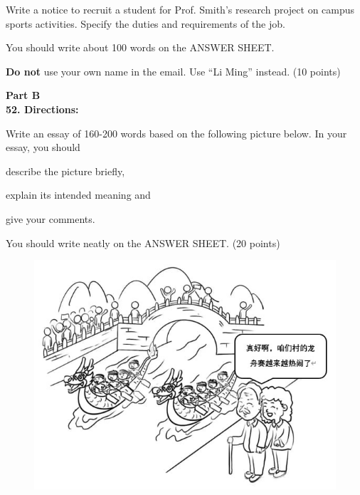 Write a notice to recruit a student for Prof. Smith's research project on campus sports activities. Specify the duties and requirements of the job.

You should write about 100 words on the ANSWER SHEET.

\textbf{Do not} use your own name in the email. Use ``Li Ming'' instead. (10
points)


\vspace{2em}

\noindent
\textbf{Part B}\\
\textbf{52. Directions:}

Write an essay of 160-200 words based on the following picture below. In
your essay, you should
\begin{listwrite}
\item 
 describe the picture briefly,

\item 
 explain its intended meaning and

\item 
 give your comments.
\end{listwrite}

You should write neatly on the ANSWER SHEET. (20 points)

\begin{figure}[h!]
	\centering
	\includegraphics[width=0.55\linewidth]{picture/2023.png}
\end{figure}


\checkpagenumber